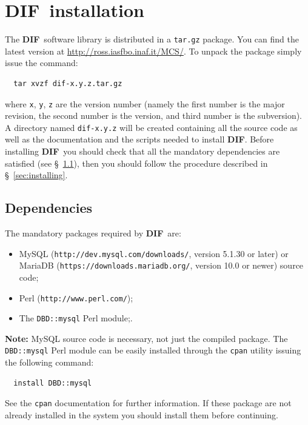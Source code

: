 \documentclass[10pt,titlepage]{article}
\newcommand{\dif}{\textbf{\small DIF}}
\begin{document}
%
%
\newpage
\section{\dif\ installation}
\label{sec:install}

The \dif\ software library is distributed in a \verb|tar.gz| package.
You can find the latest version at
\url{http://ross.iasfbo.inaf.it/MCS/}. To unpack the package simply
issue the command:
%
\begin{verbatim}
  tar xvzf dif-x.y.z.tar.gz
\end{verbatim}
% 
where \verb|x|, \verb|y|, \verb|z| are the version number (namely
the first number is the major revision, the second number is the
version, and third number is the subversion). A directory named
\verb|dif-x.y.z| will be created containing all the source code as well
as the documentation and the scripts needed to install \dif. Before
installing \dif\ you should check that all the mandatory dependencies are
satisfied (see \S\ \ref{sec:Dependencies}), then you should follow
the procedure described in \S\ \ref{sec:installing}.

\subsection{Dependencies}
\label{sec:Dependencies}
The mandatory packages required by \dif\ are:

\begin{itemize}
\item MySQL (\texttt{http://dev.mysql.com/downloads/}, version 5.1.30 or later) or
\\
 MariaDB (\texttt{https://downloads.mariadb.org/}, version 10.0 or newer) source
 code;
\item Perl (\verb|http://www.perl.com/|);
\item The \verb|DBD::mysql| Perl module;.
\end{itemize}

\noindent
\textbf{Note:} MySQL source code is necessary, not just the
compiled package. The \verb|DBD::mysql| Perl module can be easily
installed through the \verb|cpan| utility issuing the following
command:
%
\begin{verbatim}
  install DBD::mysql
\end{verbatim}
%
See the \verb|cpan| documentation for further information. If these
package are not already installed in the system you should install
them before continuing.
%
\end{document}
